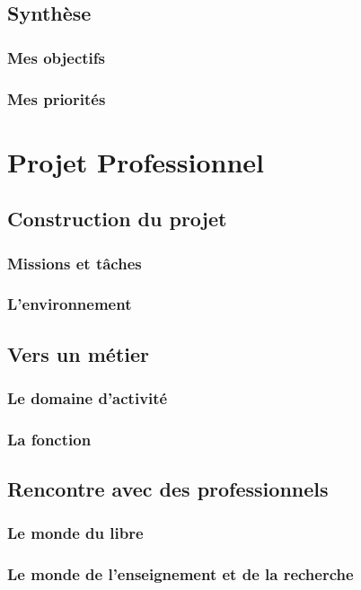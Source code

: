 \documentclass[a4paper]{report}
\begin{document}
\chapter{Synthèse}
\section{Mes objectifs}
\section{Mes priorités}

\part{Projet Professionnel}

\chapter{Construction du projet} 
\section{Missions et tâches}
\section{L'environnement}

\chapter{Vers un métier}
\section{Le domaine d'activité}
\section{La fonction}

\chapter{Rencontre avec des professionnels}
\section{Le monde du libre}
\section{Le monde de l'enseignement et de la recherche}
\end{document}
